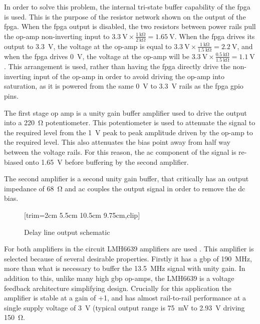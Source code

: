In order to solve this problem, the internal tri-state buffer capability of the \gls{fpga} is used. This is the purpose of the resistor network shown on the output of the \gls{fpga}. When the \gls{fpga} output is disabled, the two resistors between power rails pull the op-amp non-inverting input to $\SI{3.3}{\volt} \times\frac{\SI{1}{\kilo\ohm}}{\SI{2}{\kilo\ohm}} = \SI{1.65}{\volt}$. When the \gls{fpga} drives its output to \SI{3.3}{\volt}, the voltage at the op-amp is equal to $\SI{3.3}{\volt} \times\frac{\SI{1}{\kilo\ohm}}{\SI{1.5}{\kilo\ohm}} = \SI{2.2}{\volt}$, and when the \gls{fpga} drives \SI{0}{\volt}, the voltage at the op-amp will be $\SI{3.3}{\volt} \times\frac{\SI{0.5}{\kilo\ohm}}{\SI{1.5}{\kilo\ohm}} = \SI{1.1}{\volt}$. This arrangement is used, rather than having the \gls{fpga} directly drive the non-inverting input of the op-amp in order to avoid driving the op-amp into saturation, as it is powered from the same \SI{0}{\volt} to \SI{3.3}{\volt} rails as the \gls{fpga} \gls{gpio} pins.

The first stage op amp is a unity gain buffer amplifier used to drive the output into a \SI{220}{\ohm} potentiometer. This potentiometer is used to attenuate the signal to the required level from the \SI{1}{\volt} peak to peak amplitude driven by the op-amp to the required level. This also attenuates the bias point away from half way between the voltage rails. For this reason, the \gls{ac} component of the signal is re-biased onto \SI{1.65}{\volt} before buffering by the second amplifier.

The second amplifier is a second unity gain buffer, that critically has an output impedance of \SI{68}{\ohm} and \gls{ac} couples the output signal in order to remove the \gls{dc} bias.

\begin{figure}[ht]
	\centering
		[trim={2cm 5.5cm 10.5cm 9.75cm},clip] %
	\caption{Delay line output schematic}
	\label{fig:delay-line-output-sch}
\end{figure}

For both amplifiers in the circuit LMH6639 amplifiers are used \cite{ti2013}. This amplifier is selected because of several desirable properties. Firstly it has a \gls{gbp} of \SI{190}{\mega\hertz}, more than what is necessary to buffer the \SI{13.5}{\mega\hertz} signal with unity gain. In addition to this, unlike many high \gls{gbp} op-amps, the LMH6639 is a voltage feedback architecture simplifying design. Crucially for this application the amplifier is stable at a gain of +1, and has almost rail-to-rail performance at a single supply voltage of \SI{3}{\volt} (typical output range is \SI{75}{\milli\volt} to \SI{2.93}{\volt} driving \SI{150}{\ohm}.


